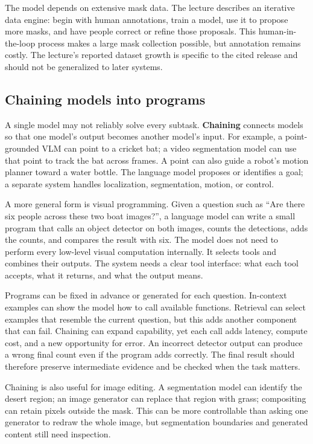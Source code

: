 The model depends on extensive mask data. The lecture describes an iterative data engine: begin with human annotations, train a model, use it to propose more masks, and have people correct or refine those proposals. This human-in-the-loop process makes a large mask collection possible, but annotation remains costly. The lecture's reported dataset growth is specific to the cited release and should not be generalized to later systems.

\subsection{Chaining models into programs}\label{04-visual-computing-ii-ch031-chaining-models-into-programs}

\hypertarget{04-visual-computing-ii-ch031-chaining-models-into-programs}{}

A single model may not reliably solve every subtask. \textbf{Chaining} connects models so that one model's output becomes another model's input. For example, a point-grounded VLM can point to a cricket bat; a video segmentation model can use that point to track the bat across frames. A point can also guide a robot's motion planner toward a water bottle. The language model proposes or identifies a goal; a separate system handles localization, segmentation, motion, or control.

A more general form is visual programming. Given a question such as ``Are there six people across these two boat images?'', a language model can write a small program that calls an object detector on both images, counts the detections, adds the counts, and compares the result with six. The model does not need to perform every low-level visual computation internally. It selects tools and combines their outputs. The system needs a clear tool interface: what each tool accepts, what it returns, and what the output means.

Programs can be fixed in advance or generated for each question. In-context examples can show the model how to call available functions. Retrieval can select examples that resemble the current question, but this adds another component that can fail. Chaining can expand capability, yet each call adds latency, compute cost, and a new opportunity for error. An incorrect detector output can produce a wrong final count even if the program adds correctly. The final result should therefore preserve intermediate evidence and be checked when the task matters.

Chaining is also useful for image editing. A segmentation model can identify the desert region; an image generator can replace that region with grass; compositing can retain pixels outside the mask. This can be more controllable than asking one generator to redraw the whole image, but segmentation boundaries and generated content still need inspection.

